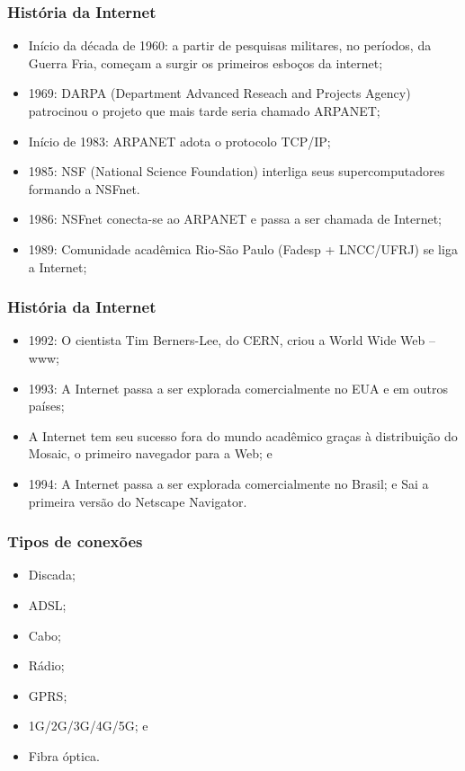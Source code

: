 \documentclass[aspectratio=169]{beamer} %
\begin{document}
\begin{frame}
	\frametitle{História da Internet}
			
	\begin{itemize}
		\item Início da década de 1960: a partir de pesquisas militares, no períodos, da Guerra Fria, começam a surgir os primeiros esboços da internet;
		\item 1969: DARPA (Department Advanced Reseach and Projects Agency) patrocinou o projeto que mais tarde seria chamado ARPANET;
		\item Início de 1983: ARPANET adota o protocolo TCP/IP;
		\item 1985: NSF (National Science Foundation) interliga seus supercomputadores formando a NSFnet.
		\item 1986: NSFnet conecta-se ao ARPANET e passa a ser chamada de Internet;
		\item 1989: Comunidade acadêmica Rio-São Paulo (Fadesp + LNCC/UFRJ) se liga a Internet;
	\end{itemize}
\end{frame}

\begin{frame}
	\frametitle{História da Internet}
			
	\begin{itemize}
		\item 1992: O cientista Tim Berners-Lee, do CERN, criou a World Wide Web – www;
		\item 1993: A Internet passa a ser explorada comercialmente no EUA e em outros países;
		\item A Internet tem seu sucesso fora do mundo acadêmico graças à distribuição do Mosaic, o primeiro navegador para a Web; e
		\item 1994: A Internet passa a ser explorada comercialmente no Brasil; e Sai a primeira versão do Netscape Navigator.
	\end{itemize}
\end{frame}

\begin{frame}
	\frametitle{Tipos de conexões}
			
	\begin{itemize}
		\item Discada; 
		\item ADSL;
		\item Cabo;
		\item Rádio;
		\item GPRS;
		\item 1G/2G/3G/4G/5G; e
		\item Fibra óptica.
	\end{itemize}
\end{frame}
\end{document}
